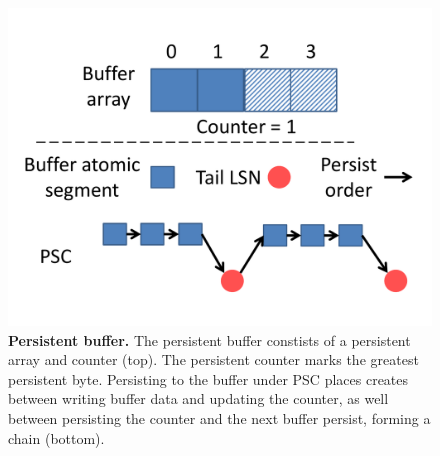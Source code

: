 \begin{figure}
\centering
\includegraphics[width=.7\textwidth]{PMC_patterns/buffer.pdf}
\caption{\textbf{Persistent buffer.} The persistent buffer constists of a persistent array and counter (top).  The persistent counter marks the greatest persistent byte.  Persisting to the buffer under PSC places creates between writing buffer data and updating the counter, as well between persisting the counter and the next buffer persist, forming a chain (bottom).}
\label{fig:buffer}
\end{figure}
